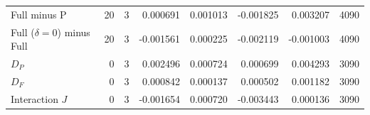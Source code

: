 \begin{tabular}{>{\raggedright\arraybackslash}p{42mm}rrrrrrl}
Full minus P & 20 & 3 & 0.000691 & 0.001013 & -0.001825 & 0.003207 & 4090 \\

Full ($\delta=0$) minus Full & 20 & 3 & -0.001561 & 0.000225 & -0.002119 & -0.001003 & 4090 \\

$D_P$ & 0 & 3 & 0.002496 & 0.000724 & 0.000699 & 0.004293 & 3090 \\

$D_F$ & 0 & 3 & 0.000842 & 0.000137 & 0.000502 & 0.001182 & 3090 \\

Interaction $J$ & 0 & 3 & -0.001654 & 0.000720 & -0.003443 & 0.000136 & 3090 \\

\bottomrule
\end{tabular}
\endgroup
